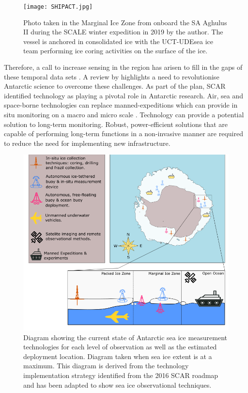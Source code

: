 \begin{figure}[H]
    \centering
    \texttt{[image: SHIPACT.jpg]}
    \caption{Photo taken in the Marginal Ice Zone from onboard the SA Aghulus II during the SCALE winter expedition in 2019 by the author. The vessel is anchored in consolidated ice with the UCT\protect\footnotemark-UDE\protect\footnotemark sea ice team performing ice coring activities on the surface of the ice.}
    \label{fig:cruise}
\end{figure}

Therefore, a call to increase sensing in the region has arisen to fill in the gaps of these temporal data sets \cite{kennicutt2019sustained}. A review by \textcite{kennicutt2016delivering} highlights a need to revolutionise Antarctic science to overcome these challenges. As part of the plan, SCAR identified technology as playing a pivotal role in Antarctic research. Air, sea and space-borne technologies can replace manned-expeditions which can provide in situ monitoring on a macro and micro scale \cite{kennicutt2016delivering}. Technology can provide a potential solution to long-term monitoring. Robust, power-efficient solutions that are capable of performing long-term functions in a non-invasive manner are required to reduce the need for implementing new infrastructure.\par

\begin{figure}[H]
    \centering
    \includegraphics[scale=0.5]{tech.png}
    \caption{ Diagram showing the current state of Antarctic sea ice measurement technologies for each level of observation as well as the estimated deployment location. Diagram taken when sea ice extent is at a maximum. This diagram is derived from the technology implementation strategy identified from the 2016 SCAR roadmap \cite{kennicutt2019sustained}\protect\footnotemark \space and has been adapted to show sea ice observational techniques. }
    \label{fig:chapter1_tech_diag}
\end{figure}

